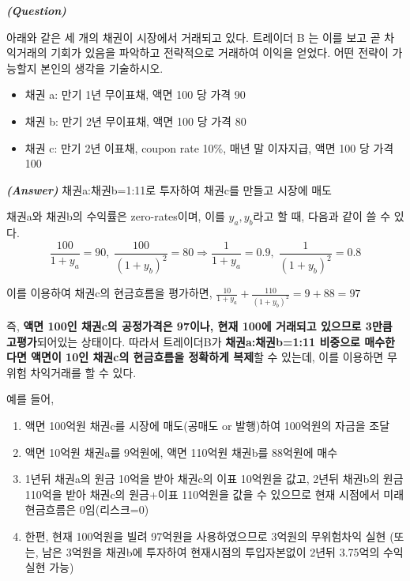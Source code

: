 \documentclass[
  letterpaper,
  DIV=11,
  numbers=noendperiod]{scrreprt}
\providecommand{\tightlist}{%
  \setlength{\itemsep}{0pt}\setlength{\parskip}{0pt}}\usepackage{longtable,booktabs,array}
\begin{document}

\textbf{\emph{(Question)}}

아래와 같은 세 개의 채권이 시장에서 거래되고 있다. 트레이더 B 는 이를
보고 곧 차익거래의 기회가 있음을 파악하고 전략적으로 거래하여 이익을
얻었다. 어떤 전략이 가능할지 본인의 생각을 기술하시오.

\begin{itemize}
\tightlist
\item
  채권 a: 만기 1년 무이표채, 액면 100 당 가격 90
\item
  채권 b: 만기 2년 무이표채, 액면 100 당 가격 80
\item
  채권 c: 만기 2년 이표채, coupon rate 10\%, 매년 말 이자지급, 액면 100
  당 가격 100
\end{itemize}

\textbf{\emph{(Answer)}} 채권a:채권b=1:11로 투자하여 채권c를 만들고
시장에 매도

채권a와 채권b의 수익률은 zero-rates이며, 이를 \(y_a,y_b\)라고 할 때,
다음과 같이 쓸 수 있다.
\[\frac{100}{1+y_a}=90,\; \frac{100}{(1+y_b)^2}=80 \Rightarrow \frac{1}{1+y_a}=0.9,\;\frac{1}{(1+y_b)^2}=0.8\]

이를 이용하여 채권c의 현금흐름을 평가하면,
\(\frac{10}{1+y_a}+\frac{110}{(1+y_b)^2}=9+88=97\)

즉, \textbf{액면 100인 채권c의 공정가격은 97이나, 현재 100에 거래되고
있으므로 3만큼 고평가}되어있는 상태이다. 따라서 트레이더B가
\textbf{채권a:채권b=1:11 비중으로 매수한다면 액면이 10인 채권c의
현금흐름을 정확하게 복제}할 수 있는데, 이를 이용하면 무위험 차익거래를
할 수 있다.

예를 들어,

\begin{enumerate}
\def\labelenumi{(\arabic{enumi})}
\item
  액면 100억원 채권c를 시장에 매도(공매도 or 발행)하여 100억원의 자금을
  조달
\item
  액면 10억원 채권a를 9억원에, 액면 110억원 채권b를 88억원에 매수
\item
  1년뒤 채권a의 원금 10억을 받아 채권c의 이표 10억원을 값고, 2년뒤
  채권b의 원금 110억을 받아 채권c의 원금+이표 110억원을 값을 수 있으므로
  현재 시점에서 미래현금흐름은 0임(리스크=0)
\item
  한편, 현재 100억원을 빌려 97억원을 사용하였으므로 3억원의 무위험차익
  실현 (또는, 남은 3억원을 채권b에 투자하여 현재시점의 투입자본없이
  2년뒤 3.75억의 수익 실현 가능)
\end{enumerate}
\end{document}
